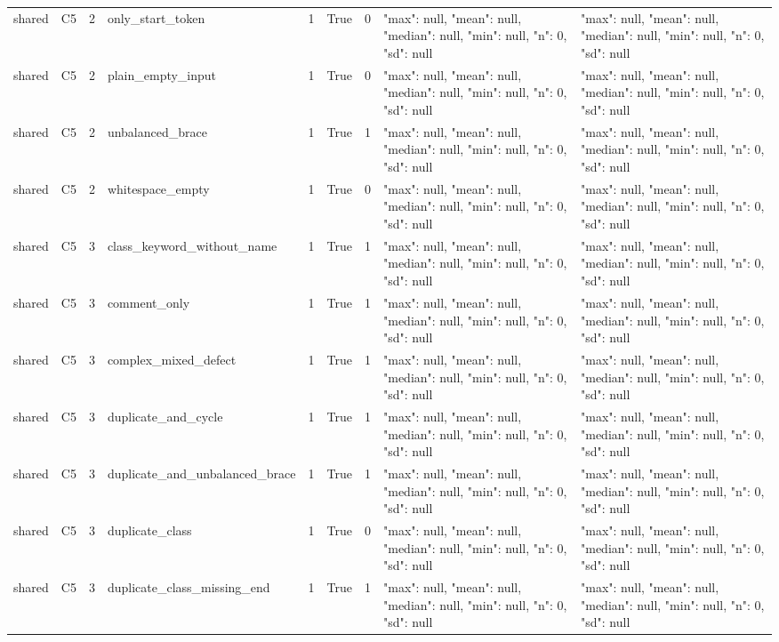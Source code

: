 \begin{tabular}{lllllllll}
shared & C5 & 2 & only\_start\_token & 1 & True & 0 & {"max": null, "mean": null, "median": null, "min": null, "n": 0, "sd": null} & {"max": null, "mean": null, "median": null, "min": null, "n": 0, "sd": null} \\
shared & C5 & 2 & plain\_empty\_input & 1 & True & 0 & {"max": null, "mean": null, "median": null, "min": null, "n": 0, "sd": null} & {"max": null, "mean": null, "median": null, "min": null, "n": 0, "sd": null} \\
shared & C5 & 2 & unbalanced\_brace & 1 & True & 1 & {"max": null, "mean": null, "median": null, "min": null, "n": 0, "sd": null} & {"max": null, "mean": null, "median": null, "min": null, "n": 0, "sd": null} \\
shared & C5 & 2 & whitespace\_empty & 1 & True & 0 & {"max": null, "mean": null, "median": null, "min": null, "n": 0, "sd": null} & {"max": null, "mean": null, "median": null, "min": null, "n": 0, "sd": null} \\
shared & C5 & 3 & class\_keyword\_without\_name & 1 & True & 1 & {"max": null, "mean": null, "median": null, "min": null, "n": 0, "sd": null} & {"max": null, "mean": null, "median": null, "min": null, "n": 0, "sd": null} \\
shared & C5 & 3 & comment\_only & 1 & True & 1 & {"max": null, "mean": null, "median": null, "min": null, "n": 0, "sd": null} & {"max": null, "mean": null, "median": null, "min": null, "n": 0, "sd": null} \\
shared & C5 & 3 & complex\_mixed\_defect & 1 & True & 1 & {"max": null, "mean": null, "median": null, "min": null, "n": 0, "sd": null} & {"max": null, "mean": null, "median": null, "min": null, "n": 0, "sd": null} \\
shared & C5 & 3 & duplicate\_and\_cycle & 1 & True & 1 & {"max": null, "mean": null, "median": null, "min": null, "n": 0, "sd": null} & {"max": null, "mean": null, "median": null, "min": null, "n": 0, "sd": null} \\
shared & C5 & 3 & duplicate\_and\_unbalanced\_brace & 1 & True & 1 & {"max": null, "mean": null, "median": null, "min": null, "n": 0, "sd": null} & {"max": null, "mean": null, "median": null, "min": null, "n": 0, "sd": null} \\
shared & C5 & 3 & duplicate\_class & 1 & True & 0 & {"max": null, "mean": null, "median": null, "min": null, "n": 0, "sd": null} & {"max": null, "mean": null, "median": null, "min": null, "n": 0, "sd": null} \\
shared & C5 & 3 & duplicate\_class\_missing\_end & 1 & True & 1 & {"max": null, "mean": null, "median": null, "min": null, "n": 0, "sd": null} & {"max": null, "mean": null, "median": null, "min": null, "n": 0, "sd": null} \\

\end{tabular}
